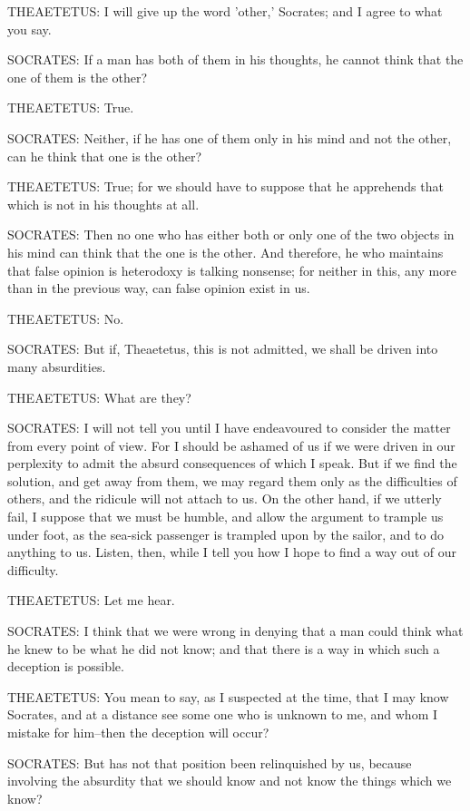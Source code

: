THEAETETUS: I will give up the word 'other,' Socrates; and I agree to
what you say.

SOCRATES: If a man has both of them in his thoughts, he cannot think
that the one of them is the other?

THEAETETUS: True.

SOCRATES: Neither, if he has one of them only in his mind and not the
other, can he think that one is the other?

THEAETETUS: True; for we should have to suppose that he apprehends that
which is not in his thoughts at all.

SOCRATES: Then no one who has either both or only one of the two objects
in his mind can think that the one is the other. And therefore, he who
maintains that false opinion is heterodoxy is talking nonsense; for
neither in this, any more than in the previous way, can false opinion
exist in us.

THEAETETUS: No.

SOCRATES: But if, Theaetetus, this is not admitted, we shall be driven
into many absurdities.

THEAETETUS: What are they?

SOCRATES: I will not tell you until I have endeavoured to consider the
matter from every point of view. For I should be ashamed of us if we
were driven in our perplexity to admit the absurd consequences of which
I speak. But if we find the solution, and get away from them, we may
regard them only as the difficulties of others, and the ridicule will
not attach to us. On the other hand, if we utterly fail, I suppose that
we must be humble, and allow the argument to trample us under foot,
as the sea-sick passenger is trampled upon by the sailor, and to do
anything to us. Listen, then, while I tell you how I hope to find a way
out of our difficulty.

THEAETETUS: Let me hear.

SOCRATES: I think that we were wrong in denying that a man could think
what he knew to be what he did not know; and that there is a way in
which such a deception is possible.

THEAETETUS: You mean to say, as I suspected at the time, that I may know
Socrates, and at a distance see some one who is unknown to me, and whom
I mistake for him--then the deception will occur?

SOCRATES: But has not that position been relinquished by us, because
involving the absurdity that we should know and not know the things
which we know?


